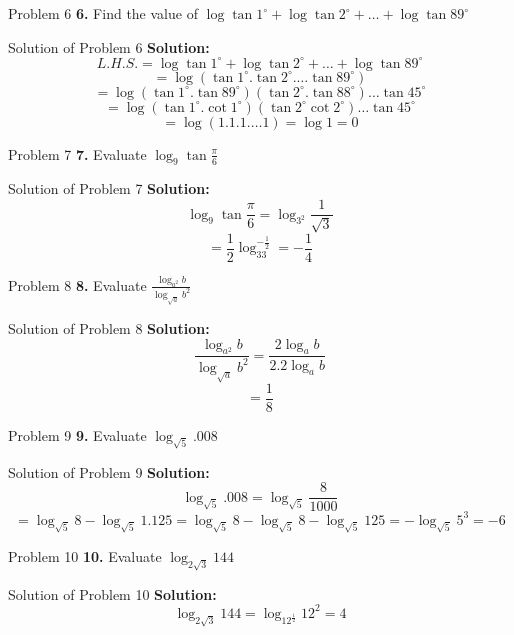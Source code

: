 \documentclass[aspectratio=169,8pt]{beamer}
\begin{document}
\begin{frame}{Problem 6}
  \textbf{6.} Find the value of $\log\tan1^\circ + \log\tan2^\circ + \ldots + \log\tan89^\circ$
\end{frame}
\begin{frame}{Solution of Problem 6}
  \textbf{Solution:}$$L.H.S. = \log\tan1^\circ + \log\tan2^\circ + \ldots + \log\tan89^\circ$$
  $$= \log(\tan1^\circ .\tan2^\circ . \ldots \tan89^\circ)$$
  $$= \log(\tan1^\circ.\tan89^\circ)(\tan2^\circ.\tan88^\circ)\ldots\tan45^\circ$$
  $$= \log(\tan1^\circ.\cot1^\circ)(\tan2^\circ\cot2^\circ)\ldots\tan45^\circ$$
  $$= \log(1.1.1.\ldots1) = \log 1 = 0$$
\end{frame}
\begin{frame}{Problem 7}
  \textbf{7.} Evaluate $\log_9\tan\frac{\pi}{6}$
\end{frame}
\begin{frame}{Solution of Problem 7}
  \textbf{Solution:} $$\log_9\tan\frac{\pi}{6} = \log_{3^2}\frac{1}{\sqrt{3}}$$
  $$= \frac{1}{2}\log_33^{-\frac{1}{2}} = -\frac{1}{4}$$
\end{frame}
\begin{frame}{Problem 8}
  \textbf{8.} Evaluate $\frac{\log_{a^2}b}{\log_{\sqrt{a}}b^2}$
\end{frame}
\begin{frame}{Solution of Problem 8}
  \textbf{Solution:} $$\frac{\log_{a^2}b}{\log_{\sqrt{a}}b^2} = \frac{2\log_a b}{2.2\log_a b}$$
  $$= \frac{1}{8}$$
\end{frame}
\begin{frame}{Problem 9}
  \textbf{9.} Evaluate $\log_{\sqrt{5}}.008$
\end{frame}
\begin{frame}{Solution of Problem 9}
  \textbf{Solution:} $$\log_{\sqrt{5}}.008 = \log_{\sqrt{5}} \frac{8}{1000}$$
  $$= \log_{\sqrt{5}}8 - \log_{\sqrt{5}}1.125 = \log_{\sqrt{5}}8 - \log_{\sqrt{5}}8 - \log_{\sqrt{5}}125 = -\log_{\sqrt{5}}5^3 = -6$$
\end{frame}
\begin{frame}{Problem 10}
  \textbf{10.} Evaluate $\log_{2\sqrt{3}}144$
\end{frame}
\begin{frame}{Solution of Problem 10}
  \textbf{Solution:}$$\log_{2\sqrt{3}}144 = \log_{12^{\frac{1}{2}}}12^2 = 4$$
\end{frame}
\end{document}

